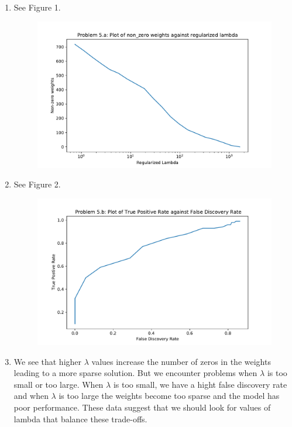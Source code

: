 \begin{enumerate}
    \item See Figure 1.
	\begin{figure}[h!]	
	    \centering
	    \includegraphics[width=0.5\linewidth]{images/P5_a.pdf}
	    \caption{}
	\end{figure}
    \item See Figure 2.
	\begin{figure}[h!]
	    \centering
	    \includegraphics[width=0.5\linewidth]{images/P5_b.pdf}
	    \caption{}
	\end{figure}
    \item We see that higher $\lambda$ values increase the number of zeros in the weights leading to a more sparse solution. But we encounter problems when $\lambda$ is too small or too large. When $\lambda$ is too small, we have a hight false discovery rate and when $\lambda$ is too large the weights become too sparse and the model has poor performance. These data suggest that we should look for values of lambda that balance these trade-offs. 
\end{enumerate}

